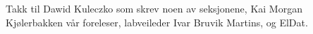 Takk til Dawid Kuleczko som skrev noen av seksjonene,
Kai Morgan Kjølerbakken vår foreleser,
labveileder Ivar Bruvik Martins,
og ElDat.
